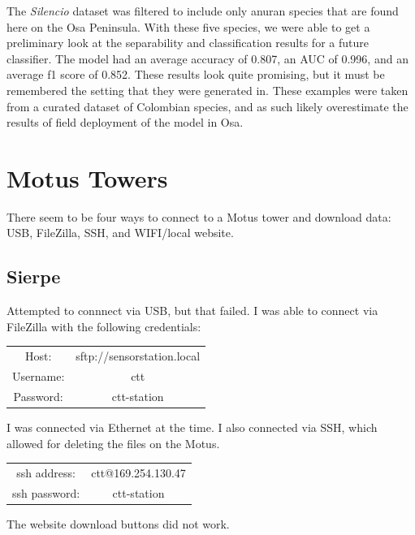 \documentclass{article}
\begin{document}
The \textit{Silencio} dataset was filtered to include only anuran species that are found here on the Osa Peninsula. 
With these five species, we were able to get a preliminary look at the separability and classification results for a future classifier. 
The model had an average accuracy of 0.807, an AUC of 0.996, and an average f1 score of 0.852.
These results look quite promising, but it must be remembered the setting that they were generated in. 
These examples were taken from a curated dataset of Colombian species, and as such likely overestimate the results of field deployment of the model in Osa. 

\section{Motus Towers}
There seem to be four ways to connect to a Motus tower and download data: USB, FileZilla, SSH, and WIFI/local website.
\subsection{Sierpe}
Attempted to connnect via USB, but that failed. I was able to connect via FileZilla with the following credentials:
\begin{center}
    \begin{tabular}{c c}
    Host: & sftp://sensorstation.local \\
    Username: & ctt \\
    Password: & ctt-station 
\end{tabular}
\end{center}
I was connected via Ethernet at the time. 
I also connected via SSH, which allowed for deleting the files on the Motus. 

\begin{center}
    \begin{tabular}{c c}
      ssh address: & ctt@169.254.130.47 \\
      ssh password: & ctt-station   
    \end{tabular}
\end{center}
The website download buttons did not work.
\end{document}
